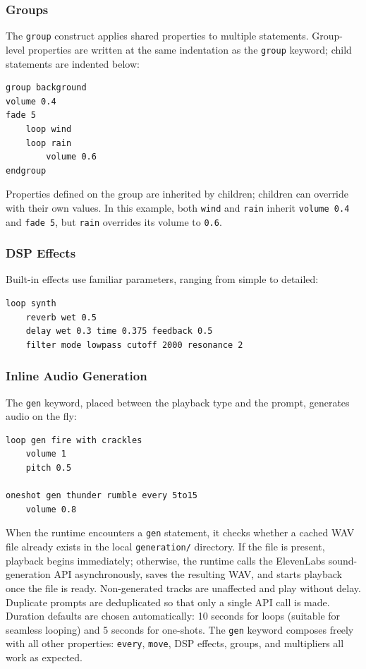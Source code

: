 \documentclass[sigconf,anonymous,review]{nimeart}
\begin{document}
\subsubsection{Groups}

The \texttt{group} construct applies shared properties to multiple statements. Group-level properties are written at the same indentation as the \texttt{group} keyword; child statements are indented below:

\begin{lstlisting}[language=satie]
group background
volume 0.4
fade 5
    loop wind
    loop rain
        volume 0.6
endgroup
\end{lstlisting}

Properties defined on the group are inherited by children; children can override with their own values. In this example, both \texttt{wind} and \texttt{rain} inherit \texttt{volume 0.4} and \texttt{fade 5}, but \texttt{rain} overrides its volume to \texttt{0.6}.

\subsubsection{DSP Effects}

Built-in effects use familiar parameters, ranging from simple to detailed:

\begin{lstlisting}[language=satie]
loop synth
    reverb wet 0.5
    delay wet 0.3 time 0.375 feedback 0.5
    filter mode lowpass cutoff 2000 resonance 2
\end{lstlisting}

\subsubsection{Inline Audio Generation}

The \texttt{gen} keyword, placed between the playback type and the prompt, generates audio on the fly:

\begin{lstlisting}[language=satie]
loop gen fire with crackles
    volume 1
    pitch 0.5

oneshot gen thunder rumble every 5to15
    volume 0.8
\end{lstlisting}

When the runtime encounters a \texttt{gen} statement, it checks whether a cached WAV file already exists in the local \texttt{generation/} directory. If the file is present, playback begins immediately; otherwise, the runtime calls the ElevenLabs sound-generation API asynchronously, saves the resulting WAV, and starts playback once the file is ready. Non-generated tracks are unaffected and play without delay. Duplicate prompts are deduplicated so that only a single API call is made. Duration defaults are chosen automatically: 10 seconds for loops (suitable for seamless looping) and 5 seconds for one-shots. The \texttt{gen} keyword composes freely with all other properties: \texttt{every}, \texttt{move}, DSP effects, groups, and multipliers all work as expected.
\end{document}

